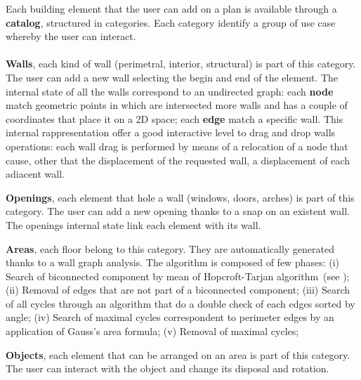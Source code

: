 Each building element that the user can add on a plan is available through a \textbf{catalog}, structured in categories. Each category identify a group of use case whereby the user can interact.\\\\
  \textbf{Walls}, each kind of wall (perimetral, interior, structural) is part of this category. The user can add a new wall selecting the begin and end of the element. The internal state of all the walls correspond to an undirected graph: each \textbf{node} match geometric points in which are intersected more walls and has a couple of coordinates that place it on a 2D space; each \textbf{edge} match a specific wall.
  This internal rappresentation offer a good interactive level to drag and drop walls operations: each wall drag is performed by means of a relocation of a node that cause, other that the displacement of the requested wall, a displacement of each adiacent wall.

  \textbf{Openings}, each element that hole a wall (windows, doors, arches) is part of this category. The user can add a new opening thanks to a snap on an existent wall. The openings internal state link each element with its wall.

   \textbf{Areas}, each floor belong to this category. They are automatically generated thanks to a wall graph analysis. The algorithm is composed of few phases: (i) Search of biconnected component by mean of Hopcroft-Tarjan algorithm~(see \cite{Hopcroft:1973:AEA:362248.362272}); (ii) Removal of edges that are not part of a biconnected component; (iii) Search of all cycles through an algorithm that do a double check of each edges sorted by angle; (iv) Search of maximal cycles correspondent to perimeter edges by an application of Gauss's area formula; (v) Removal of maximal cycles;

   \textbf{Objects}, each element that can be arranged on an area is part of this category. The user can interact with the object and change its disposal and rotation.

